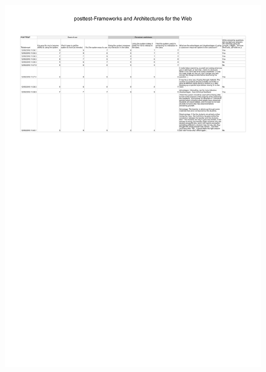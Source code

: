 \begin{figure}[H]
  \centering
    \includegraphics[angle=90]{sections/appendicies/data4.pdf}
    \caption*{}
\end{figure}

